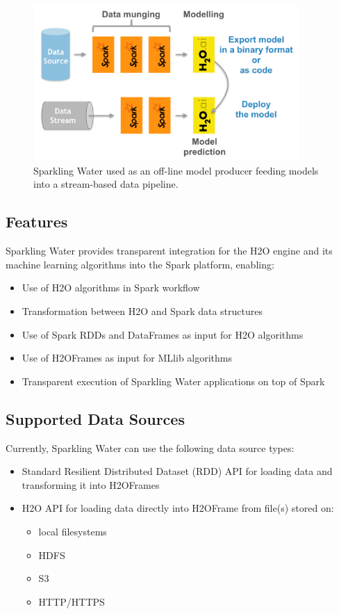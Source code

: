 \documentclass{standalone}
\begin{document}
\begin{figure}[h]
	\centering
	\includegraphics[width=0.9\textwidth]{sw/images/uc3.png}
	\caption{Sparkling Water used as an off-line model producer feeding models into a stream-based data pipeline.}
	\label{fig:uc3} 
\end{figure}

\subsection{Features}

Sparkling Water provides transparent integration for the H2O engine and its machine learning algorithms into the Spark platform, enabling:

\begin{itemize}

 \item Use of H2O algorithms in Spark workflow
 \item Transformation between H2O and Spark data structures
 \item Use of Spark RDDs and DataFrames as input for H2O algorithms
 \item Use of H2OFrames as input for MLlib algorithms
 \item Transparent execution of Sparkling Water applications on top of Spark
\end{itemize}

\subsection{Supported Data Sources}

Currently, Sparkling Water can use the following data source types:

\begin{itemize}

 \item Standard Resilient Distributed Dataset (RDD) API for loading data and transforming it into H2OFrames
 \item H2O API for loading data directly into H2OFrame from file(s) stored on:
  \begin{itemize}
    \item local filesystems
    \item HDFS
    \item S3
    \item HTTP/HTTPS
  \end{itemize}
\end{itemize}
\end{document}
